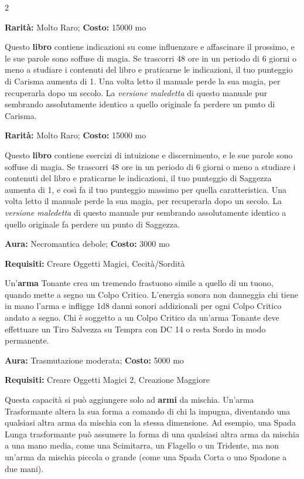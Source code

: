 \begin{multicols}{2}

\textbf{Rarità:} Molto Raro; \textbf{Costo:} 15000 mo

Questo \textbf{libro} contiene indicazioni su come influenzare e affascinare il prossimo, e le sue parole sono soffuse di magia. Se trascorri 48 ore in un periodo di 6 giorni o meno a studiare i contenuti del libro e praticarne le indicazioni, il tuo punteggio di Carisma aumenta di 1. Una volta letto il manuale perde la sua magia, per recuperarla dopo un secolo. La \emph{versione maledetta} di questo manuale pur sembrando assolutamente identico a quello originale fa perdere un punto di Carisma.


\textbf{Rarità:} Molto Raro; \textbf{Costo:} 15000 mo

Questo \textbf{libro} contiene esercizi di intuizione e discernimento, e le sue parole sono soffuse di magia. Se trascorri 48 ore in un periodo di 6 giorni o meno a studiare i contenuti del libro e praticarne le indicazioni, il tuo punteggio di Saggezza aumenta di 1, e così fa il tuo punteggio massimo per quella caratteristica. Una volta letto il manuale perde la sua magia, per recuperarla dopo un secolo. La \emph{versione maledetta} di questo manuale pur sembrando assolutamente identico a quello originale fa perdere un punto di Saggezza.


\textbf{Aura:} Necromantica debole; \textbf{Costo:} 3000 mo

\textbf{Requisiti:} Creare Oggetti Magici, Cecità/Sordità

Un'\textbf{arma} Tonante crea un tremendo frastuono simile a quello di un tuono, quando mette a segno un Colpo Critico. L'energia sonora non danneggia chi tiene in mano l'arma e infligge 1d8 danni sonori addizionali per ogni Colpo Critico andato a segno. Chi è soggetto a un Colpo Critico da un'arma Tonante deve effettuare un Tiro Salvezza su Tempra con DC 14 o resta Sordo in modo permanente.


\textbf{Aura:} Trasmutazione moderata; \textbf{Costo:} 5000 mo

\textbf{Requisiti:} Creare Oggetti Magici 2, Creazione Maggiore

Questa capacità si può aggiungere solo ad \textbf{armi} da mischia. Un'arma Trasformante altera la sua forma a comando di chi la impugna, diventando una qualsiasi altra arma da mischia con la stessa dimensione. Ad esempio, una Spada Lunga trasformante può assumere la forma di una qualsiasi altra arma da mischia a una mano media, come una Scimitarra, un Flagello o un Tridente, ma non un'arma da mischia piccola o grande (come una Spada Corta o uno Spadone a due mani).


\end{multicols}
